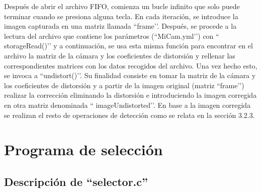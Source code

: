 Después de abrir el archivo FIFO, comienza un bucle infinito que solo puede terminar cuando se presiona alguna tecla. En cada iteración, se introduce la imagen capturada en una matriz llamada ``frame’’. Después, se procede a la lectura del archivo que contiene los parámetros (``MiCam.yml’’) con `` storageRead()’’ y a continuación, se usa esta misma función para encontrar en el archivo la matriz de la cámara y los coeficientes de distorsión y rellenar las correspondientes matrices con los datos recogidos del archivo. Una vez hecho esto, se invoca a ``undistort()’’. Su finalidad consiste en tomar la matriz de la cámara y los coeficientes de distorsión y a partir de la imagen original (matriz ``frame’’) realizar la corrección eliminando la distorsión e introduciendo la imagen corregida en otra matriz denominada `` imageUndistorted’’. En base a la imagen corregida se realizan el resto de operaciones de detección como se relata en la sección 3.2.3.


\section{Programa de selección} \label{s3_4}

\subsection{Descripción de ``selector.c''} \label{s3_4_1}

